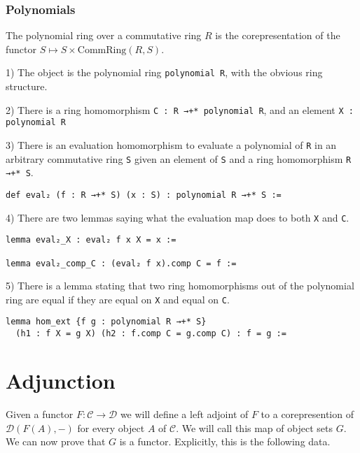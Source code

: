 \documentclass[12pt]{article} %
\theoremstyle{definition}
\theoremstyle{definition}
\theoremstyle{definition}
\theoremstyle{definition}
\begin{document}
\subsubsection{Polynomials}
The polynomial ring over a commutative ring $R$ is the corepresentation of the functor
$S \mapsto S \times \text{CommRing}(R, S)$.

1) The object is the polynomial ring \lstinline{polynomial R}, with the obvious ring structure.

2) There is a ring homomorphism \lstinline{C : R →+* polynomial R}, and an element
\lstinline{X : polynomial R}

3) There is an evaluation homomorphism to evaluate a polynomial of \lstinline{R} in
an arbitrary commutative ring \lstinline{S} given an element of \lstinline{S} and
a ring homomorphism \lstinline{R →+* S}.
\begin{lstlisting}
def eval₂ (f : R →+* S) (x : S) : polynomial R →+* S :=
\end{lstlisting}

4) There are two lemmas saying what the evaluation map does to both \lstinline{X} and
\lstinline{C}.
\begin{lstlisting}
lemma eval₂_X : eval₂ f x X = x :=

lemma eval₂_comp_C : (eval₂ f x).comp C = f :=
\end{lstlisting}

5) There is a lemma stating that two ring homomorphisms out of the polynomial ring are
equal if they are equal on \lstinline{X} and equal on \lstinline{C}.
\begin{lstlisting}
lemma hom_ext {f g : polynomial R →+* S}
  (h1 : f X = g X) (h2 : f.comp C = g.comp C) : f = g :=
\end{lstlisting}

\section{Adjunction}


Given a functor $F : \mathcal{C} \to \mathcal{D}$ we will define a left adjoint of $F$ to
a corepresention of $\mathcal{D}(F(A),-)$ for every object $A$ of $\mathcal{C}$. We will call
this map of object sets $G$. We can now prove that $G$ is a functor. Explicitly,
this is the following data.
\end{document}
